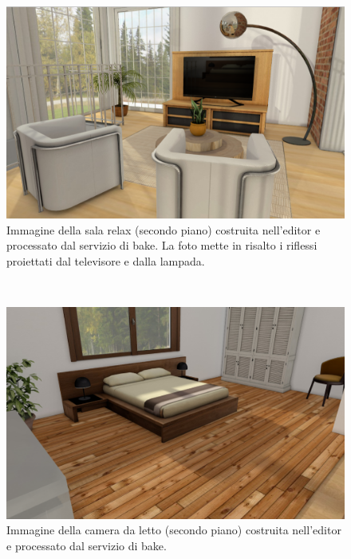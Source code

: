\\
\begin{figure}[htb]
 \centering
 \includegraphics[width=1\linewidth]{images/chapter_prove_sperimentali/scena_2_pianosup_hobby.png}\hfill
 \caption[Ambiente virtuale: Sala relax secondo piano, veduta 2]{Immagine della sala relax (secondo piano) costruita nell'editor e processato dal servizio di bake. La foto mette in risalto i riflessi proiettati dal televisore e dalla lampada.}
 \label{fig:prove_sperimentali_qualita_visiva_scena_hobby}
\end{figure}
\\
\begin{figure}[htb]
 \centering
 \includegraphics[width=1\linewidth]{images/chapter_prove_sperimentali/scena_1_pianosup_letto.png}\hfill
 \caption[Ambiente virtuale: Camera letto secondo piano]{Immagine della camera da letto (secondo piano) costruita nell'editor e processato dal servizio di bake.}
 \label{fig:prove_sperimentali_qualita_visiva_scena_hobby}
\end{figure}
